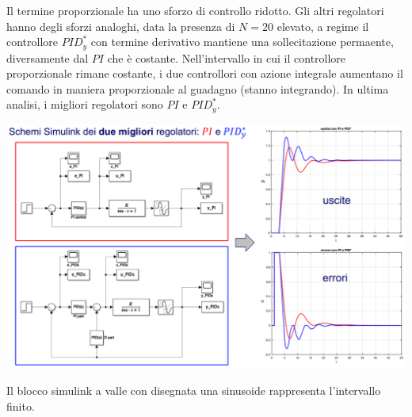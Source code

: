 \documentclass[10pt, letterpaper]{report}
\begin{document}
Il termine proporzionale ha uno sforzo di controllo ridotto. Gli altri regolatori hanno degli sforzi analoghi, data la presenza di $N=20$ elevato, a regime il controllore $PID_y^*$ con termine derivativo mantiene una sollecitazione permaente, diversamente dal $PI$ che è costante.\acc 
Nell'intervallo in cui il controllore proporzionale rimane costante, i due controllori con azione integrale aumentano il comando in maniera proporzionale al guadagno (stanno integrando). In ultima analisi, i migliori regolatori sono $PI$ e $PID_y^*$.
\begin{center}
    \includegraphics[width=\textwidth]{images/ZN13.eps}
\end{center}
Il blocco simulink a valle con disegnata una sinusoide rappresenta l'intervallo finito.
\end{document}
